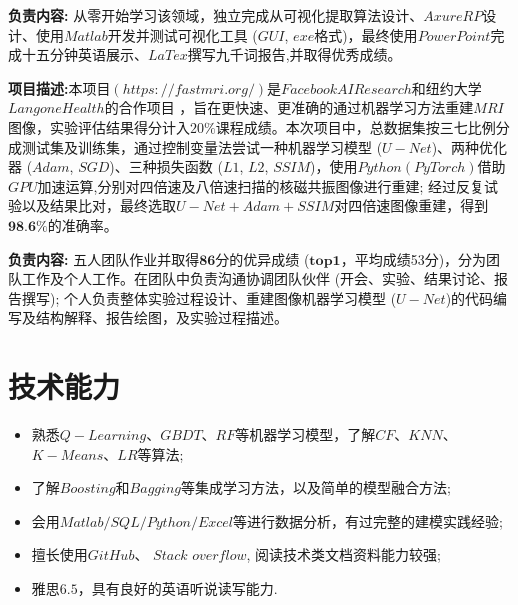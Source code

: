 \documentclass{resume}
\begin{document}
\setlength{\parindent}{2em}
\textbf{负责内容:} 从零开始学习该领域，独立完成从可视化提取算法设计、$Axure RP$设计、使用$Matlab$开发并测试可视化工具 ($GUI$, $exe$格式)，最终使用$PowerPoint$完成十五分钟英语展示、$LaTex$撰写九千词报告,并取得优秀成绩。\\


\setlength{\parindent}{2em}
\textbf{项目描述:}本项目$(https://fastmri.org/)$是$Facebook AI Research$和纽约大学$Langone Health$的合作项目 ，旨在更快速、更准确的通过机器学习方法重建$MRI$图像，实验评估结果得分计入$20\%$课程成绩。本次项目中，总数据集按三七比例分成测试集及训练集，通过控制变量法尝试一种机器学习模型 ($U-Net$)、两种优化器 ($Adam$, $SGD$)、三种损失函数 ($L1$, $L2$, $SSIM$)，使用$Python (PyTorch)$借助$GPU$加速运算,分别对四倍速及八倍速扫描的核磁共振图像进行重建; 经过反复试验以及结果比对，最终选取$U-Net+Adam+SSIM$对四倍速图像重建，得到$\textbf{98.6\%}$的准确率。

\setlength{\parindent}{2em}
\textbf{负责内容:} 五人团队作业并取得$\textbf{86}$分的优异成绩 ($\textbf{top1}$，平均成绩53分)，分为团队工作及个人工作。在团队中负责沟通协调团队伙伴 (开会、实验、结果讨论、报告撰写); 个人负责整体实验过程设计、重建图像机器学习模型 ($U-Net$)的代码编写及结构解释、报告绘图，及实验过程描述。




\section{技术能力}
\begin{itemize}[parsep=0.2ex]
  \item 熟悉$Q-Learning$、$GBDT$、$RF$等机器学习模型，了解$CF$、$KNN$、$K-Means$、$LR$等算法;
  \item 了解$Boosting$和$Bagging$等集成学习方法，以及简单的模型融合方法;
  \item 会用$Matlab/SQL/Python/Excel$等进行数据分析，有过完整的建模实践经验;
  \item 擅长使用$GitHub$、 $Stack$ $overflow$, 阅读技术类文档资料能力较强;
  \item 雅思$6.5$，具有良好的英语听说读写能力.
\end{itemize}
\end{document}
